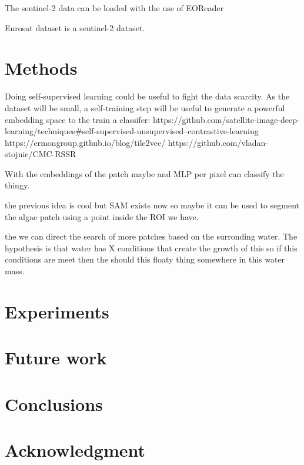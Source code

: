 \documentclass[conference]{IEEEtran}
\begin{document}
    The sentinel-2 data can be loaded with the use of EOReader\cite{eoreader_paper}

    Eurosat dataset\cite{helber2019eurosat} is a sentinel-2 dataset.


    \section{Methods}



    Doing self-supervised learning could be useful to fight the data scarcity.\cite{OKELLY1987393}
    As the dataset will be small, a self-training step will be useful to generate
    a powerful embedding space to the train a classifer:
    https://github.com/satellite-image-deep-learning/techniques#self-supervised-unsupervised--contrastive-learning
    https://ermongroup.github.io/blog/tile2vec/
    https://github.com/vladan-stojnic/CMC-RSSR

    With the embeddings of the patch maybe and MLP per pixel can classify the thingy.


    the previous idea is cool but SAM exists now so maybe it can be used to segment the algae patch
    using a point inside the ROI we have.

    the we can direct the search of more patches based on the surronding water.
    The hypothesis is that water has X conditions that create the growth of this so if this conditions
    are meet then the should this floaty thing somewhere in this water mass.


    \section{Experiments}


    \section{Future work}


    \section{Conclusions}

    \section*{Acknowledgment}

    
    
\end{document}
